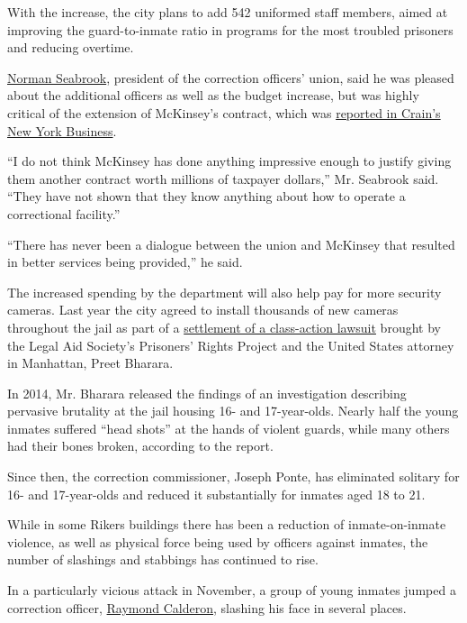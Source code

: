 With the increase, the city plans to add 542 uniformed staff members,
aimed at improving the guard-to-inmate ratio in programs for the most
troubled prisoners and reducing overtime.

\href{http://www.nytimes3xbfgragh.onion/2014/12/15/nyregion/at-rikers-a-roadblock-to-reform.html}{Norman
Seabrook}, president of the correction officers' union, said he was
pleased about the additional officers as well as the budget increase,
but was highly critical of the extension of McKinsey's contract, which
was
\href{http://www.crainsnewyork.com/article/20160125/BLOGS04/160129948/de-blasio-quadruples-down-on-outsourcing-rikers-reform}{reported
in Crain's New York Business}.

``I do not think McKinsey has done anything impressive enough to justify
giving them another contract worth millions of taxpayer dollars,'' Mr.
Seabrook said. ``They have not shown that they know anything about how
to operate a correctional facility.''

``There has never been a dialogue between the union and McKinsey that
resulted in better services being provided,'' he said.

The increased spending by the department will also help pay for more
security cameras. Last year the city agreed to install thousands of new
cameras throughout the jail as part of a
\href{http://www.nytimes3xbfgragh.onion/2015/06/23/nyregion/new-york-city-settles-suit-over-abuses-at-rikers-island.html}{settlement
of a class-action lawsuit} brought by the Legal Aid Society's Prisoners'
Rights Project and the United States attorney in Manhattan, Preet
Bharara.

In 2014, Mr. Bharara released the findings of an investigation
describing pervasive brutality at the jail housing 16- and 17-year-olds.
Nearly half the young inmates suffered ``head shots'' at the hands of
violent guards, while many others had their bones broken, according to
the report.

Since then, the correction commissioner, Joseph Ponte, has eliminated
solitary for 16- and 17-year-olds and reduced it substantially for
inmates aged 18 to 21.

While in some Rikers buildings there has been a reduction of
inmate-on-inmate violence, as well as physical force being used by
officers against inmates, the number of slashings and stabbings has
continued to rise.

In a particularly vicious attack in November, a group of young inmates
jumped a correction officer,
\href{http://www.nytimes3xbfgragh.onion/2015/11/07/nyregion/2-teenage-inmates-charged-in-attack-on-rikers-island-officer.html}{Raymond
Calderon}, slashing his face in several places.

